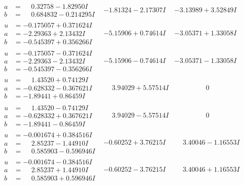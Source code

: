 \documentclass[1p]{elsarticle_modified}
\theoremstyle{definition}
\begin{document}
$$\begin{array}{c|c|c}
\begin{aligned}
a &= \phantom{-}0.32758 - 1.82950 I \\
b &= \phantom{-}0.684832 - 0.214295 I\end{aligned}
 & -1.81324 - 2.17307 I & -3.13989 + 3.52849 I \\ \hline\begin{aligned}
u &= -0.175057 + 0.371624 I \\
a &= -2.29363 + 2.13432 I \\
b &= -0.545397 + 0.356266 I\end{aligned}
 & -5.15906 + 0.74614 I & -3.05371 + 1.33058 I \\ \hline\begin{aligned}
u &= -0.175057 - 0.371624 I \\
a &= -2.29363 - 2.13432 I \\
b &= -0.545397 - 0.356266 I\end{aligned}
 & -5.15906 - 0.74614 I & -3.05371 - 1.33058 I \\ \hline\begin{aligned}
u &= \phantom{-}1.43520 + 0.74129 I \\
a &= -0.628332 - 0.367621 I \\
b &= -1.89441 + 0.86459 I\end{aligned}
 & \phantom{-}3.94029 + 5.57514 I & \phantom{-0.000000 } 0 \\ \hline\begin{aligned}
u &= \phantom{-}1.43520 - 0.74129 I \\
a &= -0.628332 + 0.367621 I \\
b &= -1.89441 - 0.86459 I\end{aligned}
 & \phantom{-}3.94029 - 5.57514 I & \phantom{-0.000000 } 0 \\ \hline\begin{aligned}
u &= -0.001674 + 0.384516 I \\
a &= \phantom{-}2.85237 - 1.44910 I \\
b &= \phantom{-}0.585903 - 0.596946 I\end{aligned}
 & -0.60252 + 3.76215 I & \phantom{-}3.40046 - 1.16553 I \\ \hline\begin{aligned}
u &= -0.001674 - 0.384516 I \\
a &= \phantom{-}2.85237 + 1.44910 I \\
b &= \phantom{-}0.585903 + 0.596946 I\end{aligned}
 & -0.60252 - 3.76215 I & \phantom{-}3.40046 + 1.16553 I \\ \hline\begin{aligned}

\end{aligned}
\end{array}$$
\end{document}
